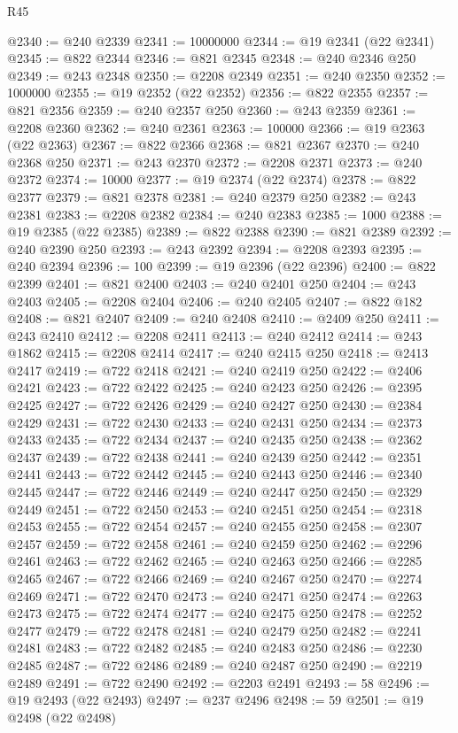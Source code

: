 \begin{lexlean}{R45}
\begin{coremodule}
{@2340 := @240 @2339
@2341 := 10000000
@2344 := @19 @2341 (@22 @2341)
@2345 := @822 @2344
@2346 := @821 @2345
@2348 := @240 @2346 @250
@2349 := @243 @2348
@2350 := @2208 @2349
@2351 := @240 @2350
@2352 := 1000000
@2355 := @19 @2352 (@22 @2352)
@2356 := @822 @2355
@2357 := @821 @2356
@2359 := @240 @2357 @250
@2360 := @243 @2359
@2361 := @2208 @2360
@2362 := @240 @2361
@2363 := 100000
@2366 := @19 @2363 (@22 @2363)
@2367 := @822 @2366
@2368 := @821 @2367
@2370 := @240 @2368 @250
@2371 := @243 @2370
@2372 := @2208 @2371
@2373 := @240 @2372
@2374 := 10000
@2377 := @19 @2374 (@22 @2374)
@2378 := @822 @2377
@2379 := @821 @2378
@2381 := @240 @2379 @250
@2382 := @243 @2381
@2383 := @2208 @2382
@2384 := @240 @2383
@2385 := 1000
@2388 := @19 @2385 (@22 @2385)
@2389 := @822 @2388
@2390 := @821 @2389
@2392 := @240 @2390 @250
@2393 := @243 @2392
@2394 := @2208 @2393
@2395 := @240 @2394
@2396 := 100
@2399 := @19 @2396 (@22 @2396)
@2400 := @822 @2399
@2401 := @821 @2400
@2403 := @240 @2401 @250
@2404 := @243 @2403
@2405 := @2208 @2404
@2406 := @240 @2405
@2407 := @822 @182
@2408 := @821 @2407
@2409 := @240 @2408
@2410 := @2409 @250
@2411 := @243 @2410
@2412 := @2208 @2411
@2413 := @240 @2412
@2414 := @243 @1862
@2415 := @2208 @2414
@2417 := @240 @2415 @250
@2418 := @2413 @2417
@2419 := @722 @2418
@2421 := @240 @2419 @250
@2422 := @2406 @2421
@2423 := @722 @2422
@2425 := @240 @2423 @250
@2426 := @2395 @2425
@2427 := @722 @2426
@2429 := @240 @2427 @250
@2430 := @2384 @2429
@2431 := @722 @2430
@2433 := @240 @2431 @250
@2434 := @2373 @2433
@2435 := @722 @2434
@2437 := @240 @2435 @250
@2438 := @2362 @2437
@2439 := @722 @2438
@2441 := @240 @2439 @250
@2442 := @2351 @2441
@2443 := @722 @2442
@2445 := @240 @2443 @250
@2446 := @2340 @2445
@2447 := @722 @2446
@2449 := @240 @2447 @250
@2450 := @2329 @2449
@2451 := @722 @2450
@2453 := @240 @2451 @250
@2454 := @2318 @2453
@2455 := @722 @2454
@2457 := @240 @2455 @250
@2458 := @2307 @2457
@2459 := @722 @2458
@2461 := @240 @2459 @250
@2462 := @2296 @2461
@2463 := @722 @2462
@2465 := @240 @2463 @250
@2466 := @2285 @2465
@2467 := @722 @2466
@2469 := @240 @2467 @250
@2470 := @2274 @2469
@2471 := @722 @2470
@2473 := @240 @2471 @250
@2474 := @2263 @2473
@2475 := @722 @2474
@2477 := @240 @2475 @250
@2478 := @2252 @2477
@2479 := @722 @2478
@2481 := @240 @2479 @250
@2482 := @2241 @2481
@2483 := @722 @2482
@2485 := @240 @2483 @250
@2486 := @2230 @2485
@2487 := @722 @2486
@2489 := @240 @2487 @250
@2490 := @2219 @2489
@2491 := @722 @2490
@2492 := @2203 @2491
@2493 := 58
@2496 := @19 @2493 (@22 @2493)
@2497 := @237 @2496
@2498 := 59
@2501 := @19 @2498 (@22 @2498)
}
\end{coremodule}
\end{lexlean}
